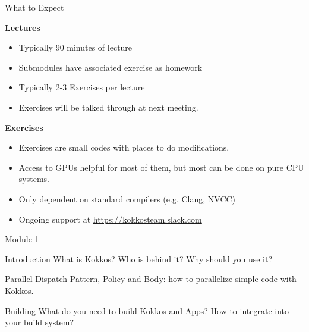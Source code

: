 \begin{frame}{What to Expect}

\textbf{Lectures}
\begin{itemize}
	\item Typically 90 minutes of lecture
	\item Submodules have associated exercise as homework
	\item Typically 2-3 Exercises per lecture
	\item Exercises will be talked through at next meeting.
\end{itemize}

	\vspace{10pt}

\textbf{Exercises}
\begin{itemize}
	\item Exercises are small codes with places to do modifications.
	\item Access to GPUs helpful for most of them, but most can be done on pure CPU systems.
	\item Only dependent on standard compilers (e.g. Clang, NVCC)
        \item Ongoing support at \url{https://kokkosteam.slack.com}
\end{itemize}
\end{frame}

\begin{frame}{Module 1}
  \begin{block}{Introduction}
    What is Kokkos? Who is behind it? Why should you use it?
  \end{block}

  \begin{block}{Parallel Dispatch}
    Pattern, Policy and Body: how to parallelize simple code with Kokkos.
  \end{block}

  \begin{block}{Building}
    What do you need to build Kokkos and Apps? How to integrate into your build system?
  \end{block}

\end{frame}
